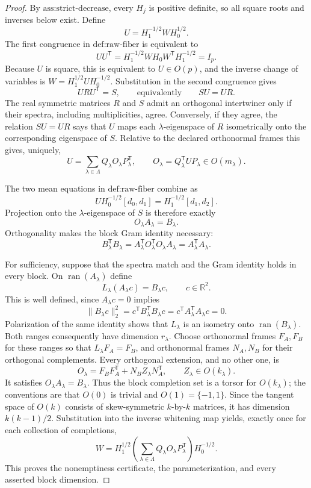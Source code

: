 \documentclass{article}
\begin{document}
\begin{proof}
By \(\text{ass:strict-decrease}\), every \(H_j\) is positive definite, so all square roots and inverses below exist.  Define
\[
 U=H_1^{-1/2}WH_0^{1/2}.
\]
The first congruence in \(\text{def:raw-fiber}\) is equivalent to
\[
 UU^{\mathsf T}=H_1^{-1/2}WH_0W^{\mathsf T}H_1^{-1/2}=I_p.
\]
Because \(U\) is square, this is equivalent to \(U\in O(p)\), and the inverse change of variables is \(W=H_1^{1/2}UH_0^{-1/2}\).  Substitution in the second congruence gives
\[
 URU^{\mathsf T}=S,
 \qquad\text{equivalently}\qquad SU=UR.
\]
The real symmetric matrices \(R\) and \(S\) admit an orthogonal intertwiner only if their spectra, including multiplicities, agree.  Conversely, if they agree, the relation \(SU=UR\) says that \(U\) maps each \(\lambda\)-eigenspace of \(R\) isometrically onto the corresponding eigenspace of \(S\).  Relative to the declared orthonormal frames this gives, uniquely,
\[
 U=\sum_{\lambda\in\Lambda}Q_\lambda O_\lambda P_\lambda^{\mathsf T},
 \qquad O_\lambda=Q_\lambda^{\mathsf T}UP_\lambda\in O(m_\lambda).
\]

The two mean equations in \(\text{def:raw-fiber}\) combine as
\[
 U H_0^{-1/2}[d_0,d_1]=H_1^{-1/2}[d_1,d_2].
\]
Projection onto the \(\lambda\)-eigenspace of \(S\) is therefore exactly
\[
 O_\lambda A_\lambda=B_\lambda.
\]
Orthogonality makes the block Gram identity necessary:
\[
 B_\lambda^{\mathsf T}B_\lambda
 =A_\lambda^{\mathsf T}O_\lambda^{\mathsf T}O_\lambda A_\lambda
 =A_\lambda^{\mathsf T}A_\lambda.
\]

For sufficiency, suppose that the spectra match and the Gram identity holds in every block.  On \(\operatorname{ran}(A_\lambda)\) define
\[
 L_\lambda(A_\lambda c)=B_\lambda c,
 \qquad c\in\mathbb R^2.
\]
This is well defined, since \(A_\lambda c=0\) implies
\[
 \lVert B_\lambda c\rVert_2^2
 =c^{\mathsf T}B_\lambda^{\mathsf T}B_\lambda c
 =c^{\mathsf T}A_\lambda^{\mathsf T}A_\lambda c=0.
\]
Polarization of the same identity shows that \(L_\lambda\) is an isometry onto \(\operatorname{ran}(B_\lambda)\).  Both ranges consequently have dimension \(r_\lambda\).  Choose orthonormal frames \(F_A,F_B\) for these ranges so that \(L_\lambda F_A=F_B\), and orthonormal frames \(N_A,N_B\) for their orthogonal complements.  Every orthogonal extension, and no other one, is
\[
 O_\lambda=F_BF_A^{\mathsf T}+N_BZ_\lambda N_A^{\mathsf T},
 \qquad Z_\lambda\in O(k_\lambda).
\]
It satisfies \(O_\lambda A_\lambda=B_\lambda\).  Thus the block completion set is a torsor for \(O(k_\lambda)\); the conventions are that \(O(0)\) is trivial and \(O(1)=\{-1,1\}\).  Since the tangent space of \(O(k)\) consists of skew-symmetric \(k\)-by-\(k\) matrices, it has dimension \(k(k-1)/2\).  Substitution into the inverse whitening map yields, exactly once for each collection of completions,
\[
 W=H_1^{1/2}\left(\sum_{\lambda\in\Lambda}
 Q_\lambda O_\lambda P_\lambda^{\mathsf T}\right)H_0^{-1/2}.
\]
This proves the nonemptiness certificate, the parameterization, and every asserted block dimension.
\end{proof}
\end{document}
